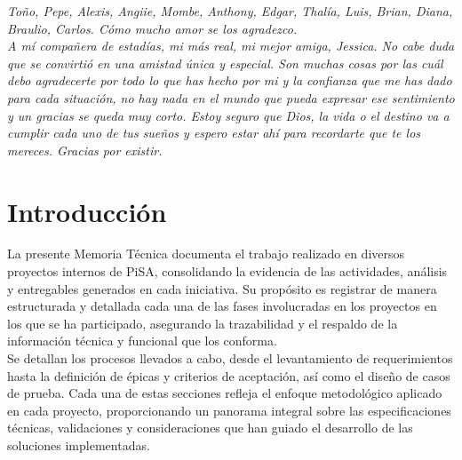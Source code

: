 \documentclass[12pt,letterpaper,spanish, xcolor=table]{report}
\numberwithin{figure}{subsection}
\newenvironment{dedication}{\newpage\large\null\em\vskip1in}%
{\vfill}
\begin{document}
\begin{dedication}
		Toño, Pepe, Alexis, Angiie, Mombe, Anthony, Edgar, Thalía, Luis, Brian, Diana, Braulio, Carlos. Cómo mucho amor se los agradezco.\\
		
		A mí compañera de estadías, mi más real, mi mejor amiga, Jessica. No cabe duda que se convirtió en una amistad única y especial.  Son muchas cosas por las cuál debo agradecerte por todo lo que has hecho por mi y la confianza que me has dado para cada situación, no hay nada en el mundo que pueda expresar ese sentimiento y un gracias se queda muy corto. Estoy seguro que Dios, la vida o el destino va a cumplir cada uno de tus sueños y espero estar ahí para recordarte que te los mereces. Gracias por existir.\\
			
		\end{dedication}



\tableofcontents




\oddsidemargin 0.2in \textwidth 6.5in \topmargin -0.25in
\textheight 9in \pagestyle{myheadings}
	
	
\newpage



\chapter{Introducción}
\newpage

La presente Memoria Técnica documenta el trabajo realizado en diversos proyectos internos de PiSA, consolidando la evidencia de las actividades, análisis y entregables generados en cada iniciativa. Su propósito es registrar de manera estructurada y detallada cada una de las fases involucradas en los proyectos en los que se ha participado, asegurando la trazabilidad y el respaldo de la información técnica y funcional que los conforma.\\

Se detallan los procesos llevados a cabo, desde el levantamiento de requerimientos hasta la definición de épicas y criterios de aceptación, así como el diseño de casos de prueba. Cada una de estas secciones refleja el enfoque metodológico aplicado en cada proyecto, proporcionando un panorama integral sobre las especificaciones técnicas, validaciones y consideraciones que han guiado el desarrollo de las soluciones implementadas.\\
\end{document}
